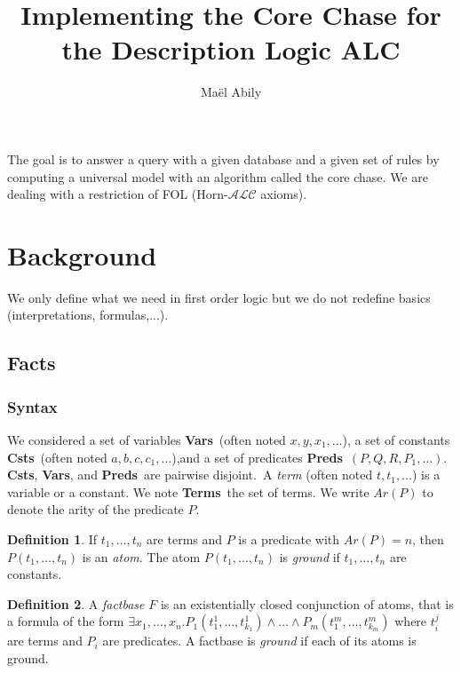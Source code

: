 \documentclass{article}
\title{Implementing the Core Chase for the Description Logic ALC}
\author{Maël Abily}
\theoremstyle{definition}
\newtheorem{definition}{Definition}[section]
\theoremstyle{remark}
\newcommand{\Vars}{\textbf{Vars}}
\newcommand{\Terms}{\textbf{Terms}}
\newcommand{\Preds}{\textbf{Preds}}
\newcommand{\Csts}{\textbf{Csts}}
\begin{document}
\maketitle						%





The goal is to answer a query with a given database and a given set of rules by computing a universal model with an algorithm called the core chase. We are dealing with a restriction of FOL (Horn-$\mathcal{ALC}$ axioms).

\tableofcontents					%
\section{Background}

We only define what we need in first order logic but we do not redefine basics (interpretations, formulas,...).

\subsection{Facts}

\subsubsection{Syntax}

We considered a set of variables \Vars\ (often noted $x,y,x_{1},\ldots$), a set of constants \Csts\ (often noted $a,b,c,c_{1},\ldots$),and a set of predicates \Preds\ $(P,Q,R,P_{1},\ldots)$. \Csts, \Vars, and \Preds\ are pairwise disjoint.\ A \emph{term}  (often noted $t,t_{1},\ldots$) is a variable or a constant. We note \Terms\ the set of terms. We write \emph{$\textit{Ar}(P)$} to denote the arity of the predicate $P$. 

\begin{definition}
If $t_1,\ldots,t_n$ are terms and $P$ is a predicate with $Ar(P) = n$, then $P(t_{1},\ldots,t_{n})$ is an \emph{atom}. The atom $P(t_{1},\ldots,t_{n})$ is \emph{ground} if $t_1,\ldots,t_n$ are constants.
\end{definition}

\begin{definition}
A \emph{factbase} $F$ is an existentially closed conjunction of atoms, that is a formula of the form $\exists x_{1},\ldots,x_{n}.P_{1}(t_{1}^{1},\ldots,t_{k_{1}}^{1})\land \ldots\land P_{m}(t_{1}^{m},\ldots,t_{k_{m}}^{m})$ where $t_i^j$ are terms and $P_i$ are predicates. A factbase is \emph{ground} if each of its atoms is ground.
\end{definition}
\end{document}

